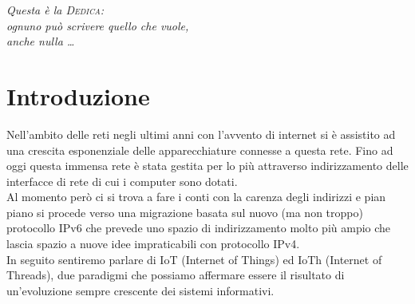 \documentclass[14pt,a4paper,openright,twoside]{extreport}
\begin{document}
\begin{titlepage}                       %
%
\thispagestyle{empty}                   %
\topmargin=6.5cm                        %
\raggedleft                             %
\large                                  %
\em                                     %
Questa \`e la \textsc{Dedica}:\\
ognuno pu\`o scrivere quello che vuole, \\
anche nulla \ldots                      %
\newpage                                %
%
\clearpage{\pagestyle{empty}\cleardoublepage}%
\end{titlepage}
\chapter*{Introduzione}                 %

Nell'ambito delle reti negli ultimi anni con l'avvento di internet si \`e assistito ad una crescita esponenziale delle apparecchiature connesse a questa rete.
Fino ad oggi questa immensa rete \`e stata gestita per lo pi\`u attraverso indirizzamento delle interfacce di rete di cui i computer sono dotati.\\
Al momento per\`o ci si trova a fare i conti con la carenza degli indirizzi e pian piano si procede verso una migrazione basata sul nuovo (ma non troppo) protocollo IPv6 che prevede uno spazio di indirizzamento molto pi\`u ampio che lascia spazio a nuove idee impraticabili con protocollo IPv4.\\
In seguito sentiremo parlare di IoT (Internet of Things) ed IoTh (Internet of Threads), due paradigmi che possiamo affermare essere il risultato di un'evoluzione sempre crescente dei sistemi informativi.
\end{document}
